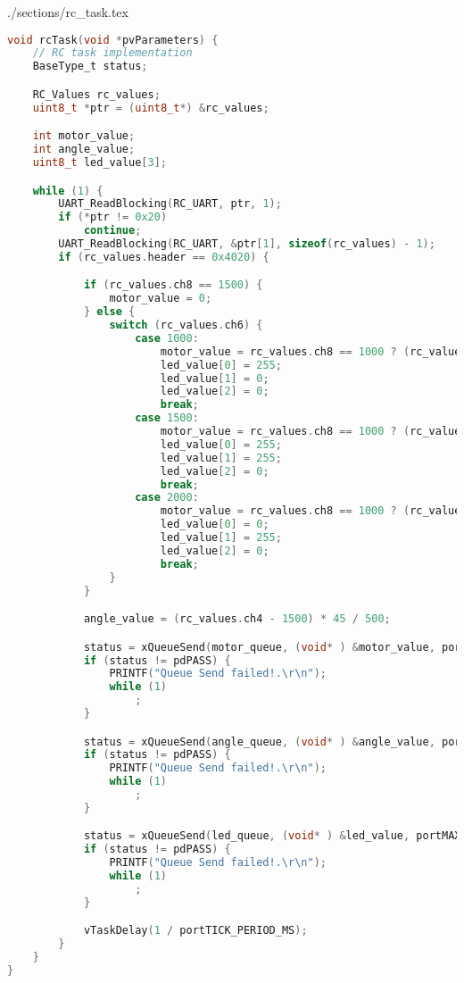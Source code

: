 \begin{filecontents}[overwrite]{./sections/rc_task.tex}
\begin{lstlisting}[language=c,caption=RC Task, label=list:rc]
void rcTask(void *pvParameters) {
    // RC task implementation
    BaseType_t status;

    RC_Values rc_values;
    uint8_t *ptr = (uint8_t*) &rc_values;

    int motor_value;
    int angle_value;
    uint8_t led_value[3];

    while (1) {
        UART_ReadBlocking(RC_UART, ptr, 1);
        if (*ptr != 0x20)
            continue;
        UART_ReadBlocking(RC_UART, &ptr[1], sizeof(rc_values) - 1);
        if (rc_values.header == 0x4020) {

            if (rc_values.ch8 == 1500) {
                motor_value = 0;
            } else {
                switch (rc_values.ch6) {
                    case 1000:
                        motor_value = rc_values.ch8 == 1000 ? (rc_values.ch2 - 1000) / 50 : (rc_values.ch2 - 1000) / -50;
                        led_value[0] = 255;
                        led_value[1] = 0;
                        led_value[2] = 0;
                        break;
                    case 1500:
                        motor_value = rc_values.ch8 == 1000 ? (rc_values.ch2 - 1000) / 20 : (rc_values.ch2 - 1000) / -20;
                        led_value[0] = 255;
                        led_value[1] = 255;
                        led_value[2] = 0;
                        break;
                    case 2000:
                        motor_value = rc_values.ch8 == 1000 ? (rc_values.ch2 - 1000) / 10 : (rc_values.ch2 - 1000) / -10;
                        led_value[0] = 0;
                        led_value[1] = 255;
                        led_value[2] = 0;
                        break;
                }
            }

            angle_value = (rc_values.ch4 - 1500) * 45 / 500;

            status = xQueueSend(motor_queue, (void* ) &motor_value, portMAX_DELAY);
            if (status != pdPASS) {
                PRINTF("Queue Send failed!.\r\n");
                while (1)
                    ;
            }

            status = xQueueSend(angle_queue, (void* ) &angle_value, portMAX_DELAY);
            if (status != pdPASS) {
                PRINTF("Queue Send failed!.\r\n");
                while (1)
                    ;
            }

            status = xQueueSend(led_queue, (void* ) &led_value, portMAX_DELAY);
            if (status != pdPASS) {
                PRINTF("Queue Send failed!.\r\n");
                while (1)
                    ;
            }

            vTaskDelay(1 / portTICK_PERIOD_MS);
        }
    }
}
\end{lstlisting}
\end{filecontents}

